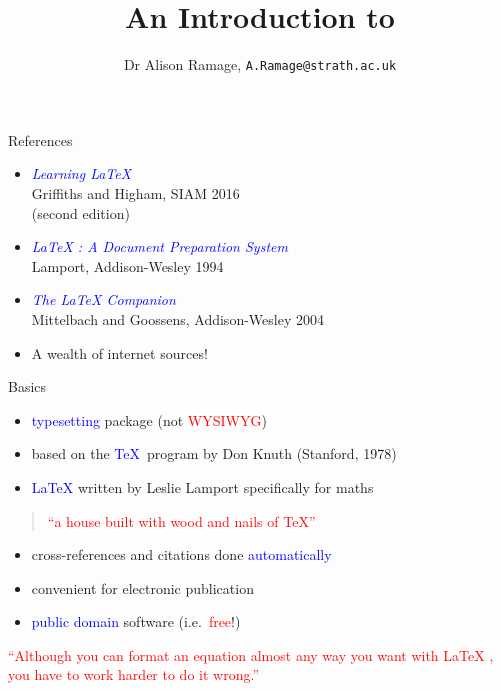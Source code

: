 \documentclass{beamer}
\title[An Introduction to \lx]
{An Introduction to \lx
}
\author{Dr Alison Ramage, \texttt{A.Ramage@strath.ac.uk}}
\institute{Dept of Mathematics and Statistics, LT10.11 Livingstone Tower}
\date{}
\newcommand{\bc}{\begin{center}}
\newcommand{\ec}{\end{center}}
\newcommand{\lx}{{\LaTeX} }
\def\mynormal{\vspace*{-0.5cm}}
\begin{document}
\begin{frame}
\titlepage
\end{frame}
\begin{frame}{References}
\begin{itemize}
\item
\textcolor{blue}{
{\em Learning \lx}}\\
Griffiths and  Higham, SIAM 2016\\
(second edition)\\
\medskip
\item
\textcolor{blue}{
{\em \lx: A Document Preparation System}}\\
Lamport, Addison-Wesley 1994 \\
\medskip

\item 
\textcolor{blue}{
{\em The \lx Companion}}\\
Mittelbach and Goossens, Addison-Wesley 2004\\

\medskip
\item A wealth of internet sources!
\end{itemize}
\end{frame}
\begin{frame}{Basics}
\mynormal
\medskip
\begin{itemize}
\item \textcolor{blue}{typesetting} package (not \textcolor{red}{WYSIWYG})
\medskip
\item based on the \textcolor{blue}{\TeX}\, program by Don Knuth (Stanford, 
1978)\\
\medskip
\item \textcolor{blue}{\lx} written by Leslie Lamport specifically for maths
\end{itemize}
\begin{quotation}
\textcolor{red}{
``a house built with wood and nails of \TeX''
}
\end{quotation}
\begin{itemize}
\pause
\item cross-references and citations done \textcolor{blue}{automatically}
\medskip
\item convenient for electronic publication
\medskip
\item \textcolor{blue}{public domain} software (i.e.\ \textcolor{red}{free}!)
\end{itemize}
\pause
\bc
\textcolor{red}{
``Although you can format an equation almost any way you want with \lx, you have
to work harder to do it wrong.''}
\ec
\end{frame}
\end{document}
